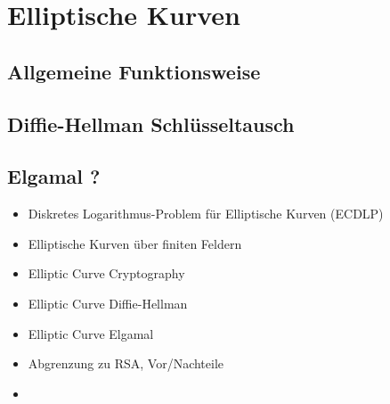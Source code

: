 
\chapter{Elliptische Kurven}

\section{Allgemeine Funktionsweise}



\section{Diffie-Hellman Schlüsseltausch}



\section{Elgamal ?}

\begin{itemize}
	\item Diskretes Logarithmus-Problem für Elliptische Kurven (ECDLP)
	\item Elliptische Kurven über finiten Feldern
	\item Elliptic Curve Cryptography
	\item Elliptic Curve Diffie-Hellman
	\item Elliptic Curve Elgamal
	\item Abgrenzung zu RSA, Vor/Nachteile
	\item 
\end{itemize}

\iffalse 

	Plot erstellen mit gnuplot:
	
	set view 0,0
	set isosample 500,500
	set contour base
	set cntrparam levels discrete 0
	unset surface
	set grid
	unset key
	unset ztics
	set xlabel 'x'
	set ylabel 'y'
	f(x,y) = x**3 + 3*x + 2 - y**2
	splot [-10:10][-10:10] f(x,y)

\fi